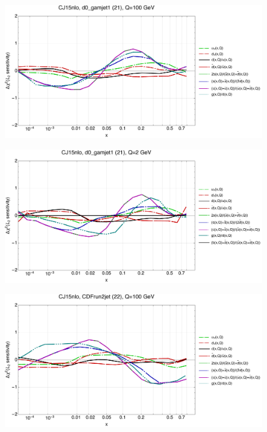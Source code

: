 \documentclass[10pt,aps,prd,floatfix,titlepage]{revtex4}
\begin{document}
\clearpage
\begin{figure}
\includegraphics[width=\textwidth,height=0.44\textheight,keepaspectratio]{2/21_CJ15nlo_q100_Sf_2.pdf}
\caption{}
\end{figure}
\begin{figure}
\includegraphics[width=\textwidth,height=0.44\textheight,keepaspectratio]{2/21_CJ15nlo_q2_Sf_2.pdf}
\caption{}
\end{figure}
\clearpage
\begin{figure}
\includegraphics[width=\textwidth,height=0.44\textheight,keepaspectratio]{2/22_CJ15nlo_q100_Sf_2.pdf}
\caption{}
\end{figure}
\end{document}

